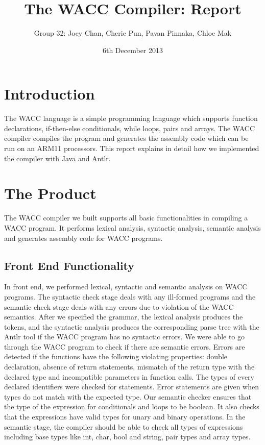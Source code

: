 \documentclass[a4paper]{article}
\theoremstyle{definition}
\begin{document}
\title{The WACC Compiler: Report}
\date{6th December 2013}
\author{
Group 32: Joey Chan, Cherie Pun, Pavan Pinnaka, Chloe Mak \\
}

\maketitle
\section{Introduction}
The WACC language is a simple programming language which supports function declarations, if-then-else conditionals, while loops, pairs and arrays. The WACC compiler compiles the program and generates the assembly code which can be run on an ARM11 processors. This report explains in detail how we implemented the compiler with Java and Antlr.
\section{The Product}
The WACC compiler we built supports all basic functionalities in compiling a WACC program. It performs lexical analysis, syntactic analysis, semantic analysis and generates assembly code for WACC programs.
\subsection{Front End Functionality}

In front end, we performed lexical, syntactic and semantic analysis on WACC programs. The syntactic check stage deals with any ill-formed programs and the semantic check stage deals with any errors due to violation of the WACC semantics. After we specified the grammar, the lexical analysis produces the tokens, and the syntactic analysis produces the corresponding parse tree with the Antlr tool if the WACC program has no syntactic errors. 
We were able to go through the WACC program to check if there are semantic errors.
Errors are detected if the functions have the following violating properties: double declaration, absence of return statements, mismatch of the return type with the declared type and incompatible parameters in function calls.
The types of every declared identifiers were checked for statements. Error statements are given when types do not match with the expected type. Our semantic checker ensures that the type of the expression for conditionals and loops to be boolean. It also checks that the expressions have valid types for unary and binary operations. In the semantic stage, the compiler should be able to check all types of expressions including base types like int, char, bool and string, pair types and array types.
\end{document}
